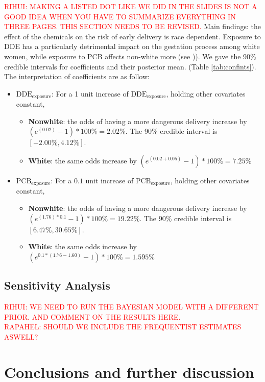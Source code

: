 \documentclass[wcp]{jmlr}%
\begin{document}
\textcolor{red}{RIHUI: MAKING A LISTED DOT LIKE WE DID IN THE SLIDES IS NOT A GOOD IDEA WHEN YOU HAVE TO SUMMARIZE EVERYTHING IN THREE PAGES. THIS SECTION NEEDS TO BE REVISED.}
Main findings: the effect of the chemicals on the risk of early delivery is race dependent. Exposure to DDE has a particularly detrimental impact on the gestation process among white women, while exposure to PCB affects non-white more (see )).
We gave the 90\% credible intervals for coefficients and their posterior mean. (Table \ref{tab:confints}). The interpretation of coefficients are as follow:
\begin{itemize}
	\item $\text{DDE}_{\text{exposure}}$: For a 1 unit increase of $\text{DDE}_{\text{exposure}}$, holding other covariates constant,
		    \begin{itemize}
		    	\item \textbf{Nonwhite}: the odds of having a more dangerous delivery increase by $(e^{(0.02)}-1)*100\%=2.02\%$. The 90\% credible interval is $[-2.00\%, 4.12\%]$.
		    	\item \textbf{White}:  the same odds increase by $(e^{(0.02+0.05)}-1)*100\%=7.25\%$
		    \end{itemize}
	\item $\text{PCB}_{\text{exposure}}$: For a $0.1$ unit increase of $\text{PCB}_{\text{exposure}}$, holding other covariates constant,
			\begin{itemize}
				\item \textbf{Nonwhite}: the odds of having a more dangerous delivery increase by $(e^{(1.76)*0.1}-1)*100\%=19.22\%$. The 90\% credible interval is $[6.47\%,30.65\%]$.
				\item \textbf{White}:  the same odds increase by $(e^{0.1*(1.76-1.60)}-1)*100\%=1.595\%$
			\end{itemize}
\end{itemize}

\subsection{Sensitivity Analysis}
\textcolor{red}{RIHUI: WE NEED TO RUN THE BAYESIAN MODEL WITH A DIFFERENT PRIOR. AND COMMENT ON THE RESULTS HERE. \\
RAPAHEL: SHOULD WE INCLUDE THE FREQUENTIST ESTIMATES ASWELL?}
\section{Conclusions and further discussion}
\label{sec:conclusion}
\end{document}
